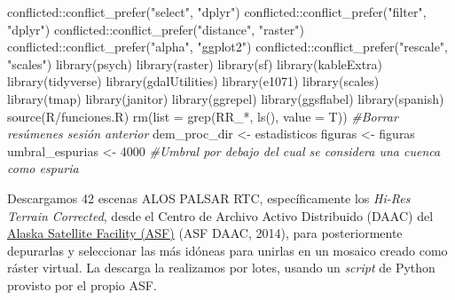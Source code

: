 \documentclass[spanish]{article}
\newenvironment{Shaded}{\begin{snugshade}}{\end{snugshade}}
\newcommand{\AttributeTok}[1]{\textcolor[rgb]{0.77,0.63,0.00}{#1}}
\newcommand{\CommentTok}[1]{\textcolor[rgb]{0.56,0.35,0.01}{\textit{#1}}}
\newcommand{\DecValTok}[1]{\textcolor[rgb]{0.00,0.00,0.81}{#1}}
\newcommand{\FunctionTok}[1]{\textcolor[rgb]{0.00,0.00,0.00}{#1}}
\newcommand{\NormalTok}[1]{#1}
\newcommand{\OtherTok}[1]{\textcolor[rgb]{0.56,0.35,0.01}{#1}}
\newcommand{\SpecialCharTok}[1]{\textcolor[rgb]{0.00,0.00,0.00}{#1}}
\newcommand{\StringTok}[1]{\textcolor[rgb]{0.31,0.60,0.02}{#1}}
\begin{document}
\begin{Shaded}
\begin{Highlighting}[]
\NormalTok{conflicted}\SpecialCharTok{::}\FunctionTok{conflict\_prefer}\NormalTok{(}\StringTok{"select"}\NormalTok{, }\StringTok{"dplyr"}\NormalTok{)}
\NormalTok{conflicted}\SpecialCharTok{::}\FunctionTok{conflict\_prefer}\NormalTok{(}\StringTok{"filter"}\NormalTok{, }\StringTok{"dplyr"}\NormalTok{)}
\NormalTok{conflicted}\SpecialCharTok{::}\FunctionTok{conflict\_prefer}\NormalTok{(}\StringTok{"distance"}\NormalTok{, }\StringTok{"raster"}\NormalTok{)}
\NormalTok{conflicted}\SpecialCharTok{::}\FunctionTok{conflict\_prefer}\NormalTok{(}\StringTok{"alpha"}\NormalTok{, }\StringTok{"ggplot2"}\NormalTok{)}
\NormalTok{conflicted}\SpecialCharTok{::}\FunctionTok{conflict\_prefer}\NormalTok{(}\StringTok{"rescale"}\NormalTok{, }\StringTok{"scales"}\NormalTok{)}
\FunctionTok{library}\NormalTok{(psych)}
\FunctionTok{library}\NormalTok{(raster)}
\FunctionTok{library}\NormalTok{(sf)}
\FunctionTok{library}\NormalTok{(kableExtra)}
\FunctionTok{library}\NormalTok{(tidyverse)}
\FunctionTok{library}\NormalTok{(gdalUtilities)}
\FunctionTok{library}\NormalTok{(e1071)}
\FunctionTok{library}\NormalTok{(scales)}
\FunctionTok{library}\NormalTok{(tmap)}
\FunctionTok{library}\NormalTok{(janitor)}
\FunctionTok{library}\NormalTok{(ggrepel)}
\FunctionTok{library}\NormalTok{(ggsflabel)}
\FunctionTok{library}\NormalTok{(spanish)}
\FunctionTok{source}\NormalTok{(}\StringTok{\textquotesingle{}R/funciones.R\textquotesingle{}}\NormalTok{)}
\FunctionTok{rm}\NormalTok{(}\AttributeTok{list =} \FunctionTok{grep}\NormalTok{(}\StringTok{\textquotesingle{}RR\_*\textquotesingle{}}\NormalTok{, }\FunctionTok{ls}\NormalTok{(), }\AttributeTok{value =}\NormalTok{ T)) }\CommentTok{\#Borrar resúmenes sesión anterior}
\NormalTok{dem\_proc\_dir }\OtherTok{\textless{}{-}} \StringTok{\textquotesingle{}estadisticos\textquotesingle{}}
\NormalTok{figuras }\OtherTok{\textless{}{-}} \StringTok{\textquotesingle{}figuras\textquotesingle{}}
\NormalTok{umbral\_espurias }\OtherTok{\textless{}{-}} \DecValTok{4000} \CommentTok{\#Umbral por debajo del cual se considera una cuenca como espuria}
\end{Highlighting}
\end{Shaded}

Descargamos 42 escenas ALOS PALSAR RTC, específicamente los \emph{Hi-Res
Terrain Corrected}, desde el Centro de Archivo Activo Distribuido (DAAC)
del \href{https://asf.alaska.edu/}{Alaska Satellite Facility (ASF)} (ASF
DAAC, 2014), para posteriormente depurarlas y seleccionar las más
idóneas para unirlas en un mosaico creado como ráster virtual. La
descarga la realizamos por lotes, usando un \emph{script} de Python
provisto por el propio ASF.
\end{document}
